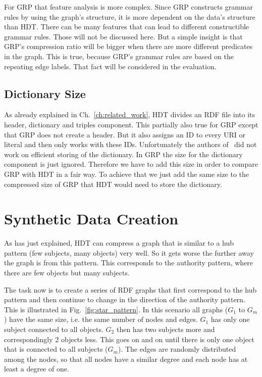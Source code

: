 For GRP that feature analysis is more complex. Since GRP constructs grammar rules by using the graph's structure, it is more dependent on the data's structure than HDT. There can be many features that can lead to different constructible grammar rules. Those will not be discussed here. But a simple insight is that GRP's compression ratio will be bigger when there are more different predicates in the graph. This is true, because GRP's grammar rules are based on the repeating edge labels. That fact will be considered in the evaluation.

\subsection{Dictionary Size}

As already explained in Ch.~\ref{ch:related_work}, HDT divides an RDF file into its header, dictionary and triples component. This partially also true for GRP except that GRP does not create a header. But it also assigns an ID to every URI or literal and then only works with these IDs. Unfortunately the authors of~\cite{maneth} did not work on efficient storing of the dictionary. In GRP the size for the dictionary component is just ignored. Therefore we have to add this size in order to compare GRP with HDT in a fair way. To achieve that we just add the same size to the compressed size of GRP that HDT would need to store the dictionary.

\section{Synthetic Data Creation}\label{sec:data_creation}

As has just explained, HDT can compress a graph that is similar to a hub pattern (few subjects, many objects) very well. So it gets worse the further away the graph is from this pattern. This corresponds to the authority pattern, where there are few objects but many subjects.

The task now is to create a series of RDF graphs that first correspond to the hub pattern and then continue to change in the direction of the authority pattern. This is illustrated in Fig.~\ref{fig:star_pattern}. In this scenario all graphs ($G_1$ to $G_m$) have the same size, i.e. the same number of nodes and edges. $G_1$ has only one subject connected to all objects. $G_2$ then has two subjects more and correspondingly 2 objects less. This goes on and on until there is only one object that is connected to all subjects ($G_m$). The edges are randomly distributed among the nodes, so that all nodes have a similar degree and each node has at least a degree of one.

